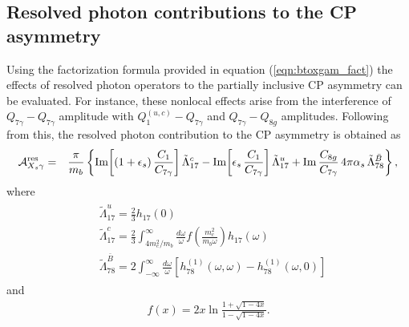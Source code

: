 \subsection{Resolved photon contributions to the CP asymmetry}\label{sec:resolved_cp_A}
Using the factorization formula provided in equation (\ref{eqn:btoxgam_fact}) the effects of resolved photon operators to the partially inclusive CP asymmetry can be evaluated. For instance, these nonlocal effects arise from the interference of $Q_{7\gamma}-Q_{7\gamma}$ amplitude with $Q_{1}^{(u,c)}-Q_{7\gamma}$ and $Q_{7\gamma}-Q_{8g}$ amplitudes. Following from this, the resolved photon contribution to the CP asymmetry is obtained as
\begin{eqnarray}\label{eqn:chapter3_resolved_contr_CPA}
   {\cal A}_{X_s\gamma}^{\rm res}
   &=& \frac{\pi}{m_b}\,\bigg\{
    \mbox{Im}\bigg[(1+\epsilon_s)\,\frac{C_1}{C_{7\gamma}}\bigg]\,\tilde\Lambda_{17}^c 
    - \mbox{Im}\bigg[\epsilon_s\,\frac{C_1}{C_{7\gamma}}\bigg]\,\tilde\Lambda_{17}^u +\mbox{Im}\,\frac{C_{8g}}{C_{7\gamma}}\,
    4\pi\alpha_s\,\tilde\Lambda_{78}^{\bar B} \bigg\} \,,
\end{eqnarray}
where 
\begin{eqnarray}
\begin{aligned}
&\tilde{\Lambda}_{17}^{u}=\frac{2}{3} h_{17}(0)\\
&\tilde{\Lambda}_{17}^{c}=\frac{2}{3} \int_{4 m_{c}^{2} / m_{b}}^{\infty} \frac{d \omega}{\omega} f\left(\frac{m_{c}^{2}}{m_{b} \omega}\right) h_{17}(\omega)\\
&\tilde{\Lambda}_{78}^{\bar{B}}=2 \int_{-\infty}^{\infty} \frac{d \omega}{\omega}\left[h_{78}^{(1)}(\omega, \omega)-h_{78}^{(1)}(\omega, 0)\right]
\end{aligned}
\end{eqnarray}
and 
\begin{eqnarray}
f(x)=2 x \ln \frac{1+\sqrt{1-4 x}}{1-\sqrt{1-4 x}}.
\end{eqnarray}

